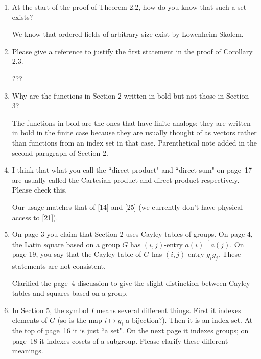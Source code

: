 \documentclass[12pt,a4paper]{article}
\newenvironment{QandA}{\begin{enumerate}[label=\bfseries\alph*.]\bfseries}
                      {\end{enumerate}}
\newenvironment{answered}{\par\normalfont}{}
\begin{document}
\begin{QandA}

\item At the start of the proof of Theorem 2.2, how do you know that such a set exists? %

\begin{answered}
We know that ordered fields of arbitrary size exist by Lowenheim-Skolem. 
\end{answered}

\item Please give a reference to justify the first statement in the proof of Corollary 2.3.

\begin{answered}
???
\end{answered}

\item Why are the functions in Section 2 written in bold but not those in Section 3?

\begin{answered}
The functions in bold are the ones that have finite analogs; they are written in bold in the finite case because they are usually thought of as vectors rather than functions from an index set in that case.  Parenthetical note added in the second paragraph of Section 2.
\end{answered}

\item I think that what you call the ``direct product" and ``direct sum" on page~17 are usually called the Cartesian product and direct product respectively. Please check this.

\begin{answered}
Our usage matches that of [14] and [25] (we currently don't have physical access to [21]).
\end{answered}



\item On page 3 you claim that Section 2 uses Cayley tables of groups. On page 4, the Latin square based on a group $G$ has $(i,j)$-entry $a(i)^{-1} a(j)$. On page 19, you say that the Cayley table of $G$ has $(i,j)$-entry $g_ig_j$. These statements are not consistent.

\begin{answered}
Clarified the page~4 discussion to give the slight distinction between Cayley tables and squares based on a group.  
\end{answered}


\item In Section 5, the symbol $I$ means several different things. First it indexes elements of $G$ (so is the map $i \mapsto g_i$ a bijection?). Then it is an index set. At the top of page~16 it is just ``a set". On the next page it indexes groups; on page~18 it indexes cosets of a subgroup. Please clarify these different meanings.



\end{QandA}
\end{document}
